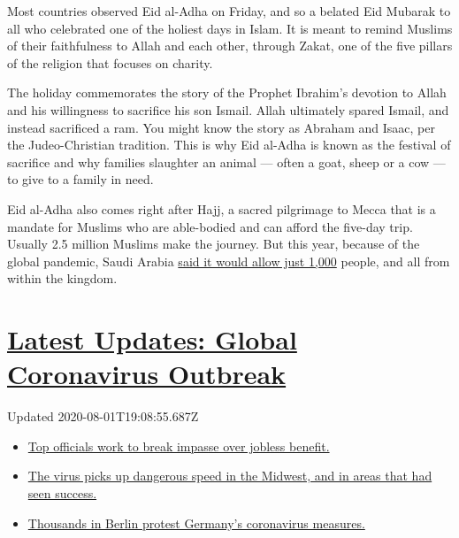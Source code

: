 Most countries observed Eid al-Adha on Friday, and so a belated Eid
Mubarak to all who celebrated one of the holiest days in Islam. It is
meant to remind Muslims of their faithfulness to Allah and each other,
through Zakat, one of the five pillars of the religion that focuses on
charity.

The holiday commemorates the story of the Prophet Ibrahim's devotion to
Allah and his willingness to sacrifice his son Ismail. Allah ultimately
spared Ismail, and instead sacrificed a ram. You might know the story as
Abraham and Isaac, per the Judeo-Christian tradition. This is why Eid
al-Adha is known as the festival of sacrifice and why families slaughter
an animal --- often a goat, sheep or a cow --- to give to a family in
need.

Eid al-Adha also comes right after Hajj, a sacred pilgrimage to Mecca
that is a mandate for Muslims who are able-bodied and can afford the
five-day trip. Usually 2.5 million Muslims make the journey. But this
year, because of the global pandemic, Saudi Arabia
\href{https://www.nytimes3xbfgragh.onion/2020/07/30/world/middleeast/pilgrims-hajj-mecca-coronavirus-pandemic.html}{said
it would allow just 1,000} people, and all from within the kingdom.

\hypertarget{latest-updates-global-coronavirus-outbreak}{%
\section{\texorpdfstring{\href{https://www.nytimes3xbfgragh.onion/2020/08/01/world/coronavirus-covid-19.html?action=click\&pgtype=Article\&state=default\&region=MAIN_CONTENT_1\&context=storylines_live_updates}{Latest
Updates: Global Coronavirus
Outbreak}}{Latest Updates: Global Coronavirus Outbreak}}\label{latest-updates-global-coronavirus-outbreak}}

Updated 2020-08-01T19:08:55.687Z

\begin{itemize}
\tightlist
\item
  \href{https://www.nytimes3xbfgragh.onion/2020/08/01/world/coronavirus-covid-19.html?action=click\&pgtype=Article\&state=default\&region=MAIN_CONTENT_1\&context=storylines_live_updates\#link-3ac56579}{Top
  officials work to break impasse over jobless benefit.}
\item
  \href{https://www.nytimes3xbfgragh.onion/2020/08/01/world/coronavirus-covid-19.html?action=click\&pgtype=Article\&state=default\&region=MAIN_CONTENT_1\&context=storylines_live_updates\#link-8796723}{The
  virus picks up dangerous speed in the Midwest, and in areas that had
  seen success.}
\item
  \href{https://www.nytimes3xbfgragh.onion/2020/08/01/world/coronavirus-covid-19.html?action=click\&pgtype=Article\&state=default\&region=MAIN_CONTENT_1\&context=storylines_live_updates\#link-25930521}{Thousands
  in Berlin protest Germany's coronavirus measures.}
\end{itemize}

